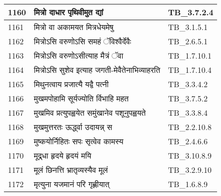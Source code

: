 \documentclass[17pt]{extarticle}
\begin{document}
\begin{longtable}{||p{0.4in}||p{4.9in}||p{0.9in}||}
    1160 & मित्रो दाधार पृथिवीमुत द्यां & TB\_3.7.2.4       \\
    
    \hline
        
    1161 & मित्रो वा अकामयत मित्रधेयमेषु & TB\_3.1.5.1       \\
    
    \hline
        
    1162 & मित्रोऽसि वरुणोऽसि समहं ॅविश्वैर्देवैः & TB\_2.6.5.1       \\
    
    \hline
        
    1163 & मित्रोऽसि वरुणोऽसीत्याह मैत्रं ॅवा & TB\_1.7.10.1       \\
    
    \hline
        
    1164 & मित्रोऽसि सुशेव इत्याह जगती{-}मेवैतेनाभिव्याहरति & TB\_1.7.10.4       \\
    
    \hline
        
    1165 & मिथुनत्वाय प्रजात्यै यद्वै पत्नी & TB\_3.3.4.2       \\
    
    \hline
        
    1166 & मुखमपोहामि सूर्यज्योति र्विभाहि महत & TB\_3.7.5.2       \\
    
    \hline
        
    1167 & मुखमिव प्रत्युपह्वयेत समुंखानेव पशूनुपह्वयते & TB\_3.3.8.4       \\
    
    \hline
        
    1168 & मुखमुत्तरतः ऊर्द्ध्वा उदायन्न् स & TB\_2.2.10.8       \\
    
    \hline
        
    1169 & मुष्कयोर्निहितः सपः सृत्वेव कामस्य & TB\_2.4.6.6       \\
    
    \hline
        
    1170 & मूद्र्धा हृदये हृदयं मयि & TB\_3.10.8.9       \\
    
    \hline
        
    1171 & मूलं छिनत्ति भ्रातृव्यस्यैव मूलं & TB\_3.2.9.10       \\
    
    \hline
        
    1172 & मृत्युना यजमानं परि गृह्णीयात् & TB\_1.6.8.9       \\
    

\end{longtable}
\end{document}
